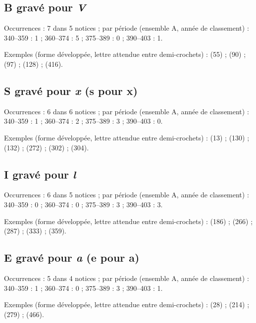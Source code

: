 \subsection*{B gravé pour \textit{V}}
\noindent Occurrences : 7 dans 5 notices ; par période (ensemble A, année de classement) : 340–359 : 1 ; 360–374 : 5 ; 375–389 : 0 ; 390–403 : 1.\par
\noindent Exemples (forme développée, lettre attendue entre demi-crochets) :  (55) ;  (90) ;  (97) ;  (128) ;  (416).\par
{}\par\medskip
\subsection*{S gravé pour \textit{x} (s pour x)}
\noindent Occurrences : 6 dans 6 notices ; par période (ensemble A, année de classement) : 340–359 : 1 ; 360–374 : 2 ; 375–389 : 3 ; 390–403 : 0.\par
\noindent Exemples (forme développée, lettre attendue entre demi-crochets) :  (13) ;  (130) ;  (132) ;  (272) ;  (302) ;  (304).\par
{}\par\medskip
\subsection*{I gravé pour \textit{l}}
\noindent Occurrences : 6 dans 5 notices ; par période (ensemble A, année de classement) : 340–359 : 0 ; 360–374 : 0 ; 375–389 : 3 ; 390–403 : 3.\par
\noindent Exemples (forme développée, lettre attendue entre demi-crochets) :  (186) ;  (266) ;  (287) ;  (333) ;  (359).\par
{}\par\medskip
\subsection*{E gravé pour \textit{a} (e pour a)}
\noindent Occurrences : 5 dans 4 notices ; par période (ensemble A, année de classement) : 340–359 : 1 ; 360–374 : 0 ; 375–389 : 3 ; 390–403 : 1.\par
\noindent Exemples (forme développée, lettre attendue entre demi-crochets) :  (28) ;  (214) ;  (279) ;  (466).\par
{}\par\medskip
